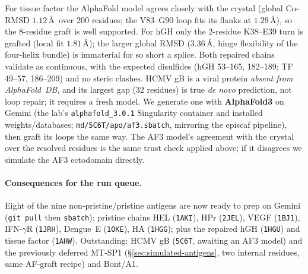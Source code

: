 \noindent For tissue factor the AlphaFold model agrees closely with the crystal (global
C$\alpha$-RMSD $1.12$\,\AA\ over 200 residues; the V83--G90 loop fits its flanks at $1.29$\,\AA),
so the 8-residue graft is well supported. For hGH only the 2-residue K38--E39 turn is grafted
(local fit $1.81$\,\AA); the larger global RMSD ($3.36$\,\AA, hinge flexibility of the four-helix
bundle) is immaterial for so short a splice. Both repaired chains validate as continuous, with the
expected disulfides (hGH 53--165, 182--189; TF 49--57, 186--209) and no steric clashes. HCMV gB is
a viral protein \emph{absent from AlphaFold~DB}, and its largest gap (32 residues) is true
\emph{de novo} prediction, not loop repair; it requires a fresh model. We generate one with
\textbf{AlphaFold3} on Gemini (the lab's \texttt{alphafold\_3.0.1} Singularity container and
installed weights/databases; \texttt{md/5C6T/apo/af3.sbatch}, mirroring the episcaf pipeline), then
graft its loops the same way. The AF3 model's agreement with the crystal over the resolved residues
is the same trust check applied above; if it disagrees we simulate the AF3 ectodomain directly.

\paragraph{Consequences for the run queue.} Eight of the nine non-pristine/pristine antigens are
now ready to prep on Gemini (\texttt{git pull} then \texttt{sbatch}): pristine chains HEL
(\texttt{1AKI}), HPr (\texttt{2JEL}), VEGF (\texttt{1BJ1}), IFN-$\gamma$R (\texttt{1JRH}),
Dengue~E (\texttt{1OKE}), HA (\texttt{1HGG}); plus the repaired hGH (\texttt{1HGU}) and tissue
factor (\texttt{1AHW}). Outstanding: HCMV gB (\texttt{5C6T}, awaiting an AF3 model) and the
previously deferred MT-SP1 (\S\ref{sec:simulated-antigens}, two internal residues, same AF-graft
recipe) and Bont/A1.
